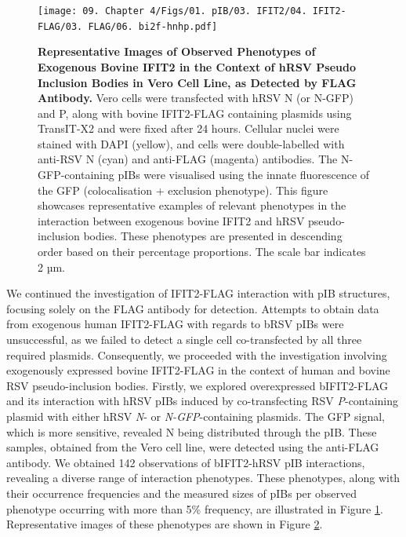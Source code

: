 \begin{figure}
    \label{fig:Observed Phenotypes of Exogenous Bovine IFIT2 in the Context of hRSV Pseudo Inclusion Bodies in Vero Cell Line, as Detected by FLAG Antibody}
\end{figure}

\begin{figure}
    \centering
    \texttt{[image: 09. Chapter 4/Figs/01. pIB/03. IFIT2/04. IFIT2-FLAG/03. FLAG/06. bi2f-hnhp.pdf]}
    \caption[Representative Images of Observed Phenotypes of Exogenous Bovine IFIT2 in the Context of hRSV Pseudo Inclusion Bodies in Vero Cell Line, as Detected by FLAG Antibody.]{\textbf{Representative Images of Observed Phenotypes of Exogenous Bovine IFIT2 in the Context of hRSV Pseudo Inclusion Bodies in Vero Cell Line, as Detected by FLAG Antibody.} Vero cells were transfected with hRSV N (or N-GFP) and P, along with bovine IFIT2-FLAG containing plasmids using TransIT-X2 and were fixed after 24 hours. Cellular nuclei were stained with DAPI (yellow), and cells were double-labelled with anti-RSV N (cyan) and anti-FLAG (magenta) antibodies. The N-GFP-containing pIBs were visualised using the innate fluorescence of the GFP (colocalisation + exclusion phenotype). This figure showcases representative examples of relevant phenotypes in the interaction between exogenous bovine IFIT2 and hRSV pseudo-inclusion bodies. These phenotypes are presented in descending order based on their percentage proportions. The scale bar indicates 2 µm.}
    \label{fig:Representative Images of Observed Phenotypes of Exogenous Bovine IFIT2 in the Context of hRSV Pseudo Inclusion Bodies in Vero Cell Line, as Detected by FLAG Antibody}
\end{figure}

We continued the investigation of IFIT2-FLAG interaction with pIB structures, focusing solely on the FLAG antibody for detection. Attempts to obtain data from exogenous human IFIT2-FLAG with regards to bRSV pIBs were unsuccessful, as we failed to detect a single cell co-transfected by all three required plasmids. Consequently, we proceeded with the investigation involving exogenously expressed bovine IFIT2-FLAG in the context of human and bovine RSV pseudo-inclusion bodies. Firstly, we explored overexpressed bIFIT2-FLAG and its interaction with hRSV pIBs induced by co-transfecting RSV \textit{P}-containing plasmid with either hRSV \textit{N}- or \textit{N-GFP}-containing plasmids. The GFP signal, which is more sensitive, revealed N being distributed through the pIB. These samples, obtained from the Vero cell line, were detected using the anti-FLAG antibody. We obtained 142 observations of bIFIT2-hRSV pIB interactions, revealing a diverse range of interaction phenotypes. These phenotypes, along with their occurrence frequencies and the measured sizes of pIBs per observed phenotype occurring with more than 5\% frequency, are illustrated in Figure \ref{fig:Observed Phenotypes of Exogenous Bovine IFIT2 in the Context of hRSV Pseudo Inclusion Bodies in Vero Cell Line, as Detected by FLAG Antibody}. Representative images of these phenotypes are shown in Figure \ref{fig:Representative Images of Observed Phenotypes of Exogenous Bovine IFIT2 in the Context of hRSV Pseudo Inclusion Bodies in Vero Cell Line, as Detected by FLAG Antibody}.

